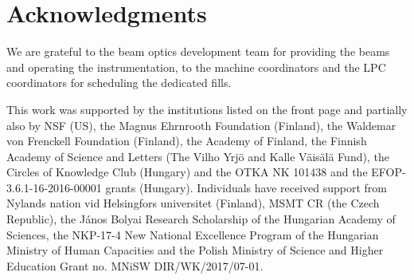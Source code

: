 \documentclass[TOTEM]{cernphprep}
\begin{document}
\section*{Acknowledgments}

We are grateful to the beam optics development team for providing the beams and operating the instrumentation, to the machine coordinators
and the LPC coordinators for scheduling the dedicated fills.

This work was supported by the institutions listed on the
front page and partially also by NSF (US), the Magnus Ehrnrooth Foundation (Finland), the Waldemar von
Frenckell Foundation (Finland), the Academy of Finland,
the Finnish Academy of Science and Letters (The Vilho 
Yrj\"o and Kalle V\"ais\"al\"a Fund), the Circles of Knowledge Club (Hungary) and the OTKA NK 101438 and the EFOP-3.6.1-16-2016-00001 grants
(Hungary). Individuals have received support from Nylands nation vid Helsingfors universitet (Finland),
MSMT CR (the Czech Republic), the J\'{a}nos Bolyai Research Scholarship of
the Hungarian Academy of Sciences, the NKP-17-4 New National Excellence Program of the
Hungarian Ministry of Human Capacities and the Polish Ministry of Science and Higher Education
Grant no. MNiSW DIR/WK/2017/07-01.

\clearpage


\end{document}
